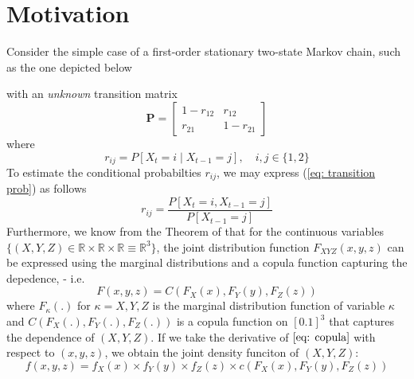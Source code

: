 \documentclass[harvard,11pt]{article}
\newcommand{\R}{\mathbb{R}}
\begin{document}
\section{Motivation \label{Motivation}}
Consider the simple case of a first-order stationary two-state Markov chain, such as the one depicted below

\begin{center}
\end{center}
with an \textit{unknown} transition matrix 
\[
\mathbf{P}=
\begin{bmatrix}
1-r_{12}&r_{12}\\
r_{21}&1-r_{21}
\end{bmatrix}
\]
where
\begin{equation}\label{eq: transition prob}
r_{ij}=P[X_t=i \mid X_{t-1}=j],\quad i,j\in\{1,2\}
\end{equation}
To estimate the conditional probabilties $r_{ij}$, we may express (\ref{eq: transition prob}) as follows
\begin{equation}
r_{ij}=\frac{P[X_t=i, X_{t-1}=j]}{P[X_{t-1}=j]}
\end{equation}
Furthermore, we know from the Theorem of \citet{sklar1959fonctions} that for the continuous variables $\{(X,Y,Z)\in\R\times\R\times\R\equiv \R^3\}$, the joint distribution function $F_{XYZ}(x,y,z)$ can be expressed using the marginal distributions and a copula function capturing the depedence, - i.e. 
\begin{equation}\label{eq: copula}
F(x,y,z)=C(F_X(x),F_Y(y),F_Z(z))
\end{equation}
where $F_{\kappa}(.)$ for $\kappa=X, Y, Z$ is the marginal distribution function of variable $\kappa$ and $C(F_X(.),F_Y(.),F_Z(.))$ is a copula function on $[0.1]^3$ that captures the dependence of $(X,Y,Z)$. If we take the derivative of $\ref{eq: copula}$ with respect to $(x,y,z)$, we obtain the joint density funciton of $(X,Y,Z)$:
\begin{equation}\label{eq: density}
f(x,y,z)=f_X(x)\times f_Y(y)\times f_Z(z)\times c(F_X(x),F_Y(y),F_Z(z))
\end{equation}
\end{document}
